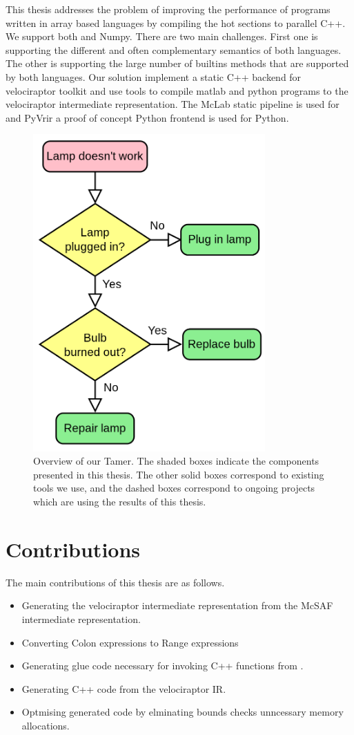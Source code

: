 This thesis addresses the problem of improving the performance of programs written in array based languages by compiling the hot sections to parallel C++. We support both \matlab and Numpy. There are two main challenges. First one is supporting the different and often complementary semantics of both languages. The other is supporting the large number of builtins methods that are supported by both languages.
Our solution implement a static C++ backend for velociraptor toolkit and use tools to compile matlab and python programs to the velociraptor intermediate representation. The McLab static pipeline is used for \matlab and PyVrir a proof of concept Python frontend is used for Python. 
\begin{figure}[htbp]
\begin{center}
\includegraphics[width=3.5in]{Figures/overview.png}
\caption[Overview of the \matlab Tamer]{Overview
of our \matlab Tamer.  The shaded boxes indicate the components
presented in this thesis.  The other solid boxes correspond to
existing \mclab tools we use, and the dashed boxes correspond to
ongoing projects which are using the results of this
thesis.}\label{Fig:Overview}
\end{center}
\end{figure}
\section{Contributions}
The main contributions of this thesis are as follows.
\begin{itemize}
\item Generating the velociraptor intermediate representation from the McSAF intermediate representation. 
\item Converting Colon expressions to Range expressions
\item Generating glue code necessary for invoking C++ functions from \matlab.
\item Generating C++ code from the velociraptor IR.
\item Optmising generated code by elminating bounds checks unncessary memory allocations. 
\end{itemize}
